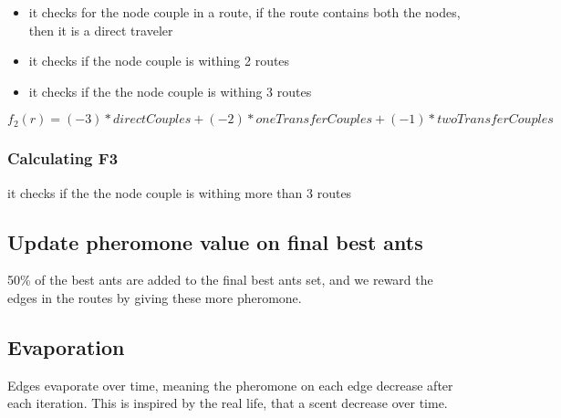 \begin{itemize}
\item it checks for the node couple in a route, if the route contains both the nodes, then it is a direct traveler
\item it checks if the node couple is withing 2 routes
\item it checks if the the node couple is withing 3 routes
\end{itemize}

$f_2(r) = (-3) * directCouples + (-2) * oneTransferCouples + (-1) * twoTransferCouples $

\subsubsection{Calculating F3}
it checks if the the node couple is withing more than 3 routes


\subsection{Update pheromone value on final best ants}

\begin{algorithm}[H]
\end{algorithm}

50\% of the best ants are added to the final best ants set, and we reward the edges in the routes by giving these more pheromone.

\subsection{Evaporation}

\begin{algorithm}[H]
\end{algorithm}

Edges evaporate over time, meaning the pheromone on each edge decrease after each iteration. This is inspired by the real life, that a scent decrease over time.


